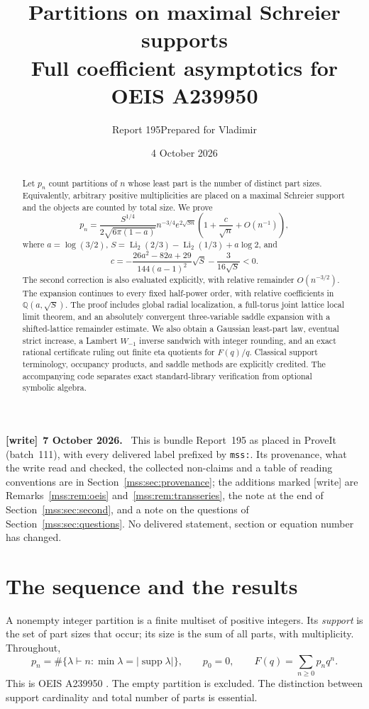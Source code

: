 \documentclass[11pt,letterpaper]{article}
\title{\LARGE\bfseries Partitions on maximal Schreier supports\\[8pt]\large Full coefficient asymptotics for OEIS A239950}
\author{Report 195\quad Prepared for Vladimir}
\date{4 October 2026}
\numberwithin{equation}{section}
\theoremstyle{definition}\newtheorem{definition}[theorem]{Definition}
\theoremstyle{remark}\newtheorem{remark}[theorem]{Remark}
\DeclareMathOperator{\Li}{Li}
\newcommand{\file}[1]{\nolinkurl{#1}}
\newenvironment{writenote}[1][]{\par\smallskip\begingroup\small
 \noindent\textbf{[write]}\if\relax\detokenize{#1}\relax\else~\textbf{#1.}\fi\ }%
 {\par\endgroup\smallskip}
\begin{document}
\maketitle
\begin{abstract}
Let $p_n$ count partitions of $n$ whose least part is the number of distinct part sizes. Equivalently, arbitrary positive multiplicities are placed on a maximal Schreier support and the objects are counted by total size. We prove
\[
p_n=\frac{S^{1/4}}{2\sqrt{6\pi(1-a)}}n^{-3/4}e^{2\sqrt{Sn}}
\left(1+\frac{c}{\sqrt n}+O(n^{-1})\right),
\]
where $a=\log(3/2)$, $S=\Li_2(2/3)-\Li_2(1/3)+a\log2$, and
\[
c=-\frac{26a^2-82a+29}{144(a-1)^2}\sqrt S-\frac{3}{16\sqrt S}<0.
\]
The second correction is also evaluated explicitly, with relative remainder $O(n^{-3/2})$. The expansion continues to every fixed half-power order, with relative coefficients in $\mathbb Q(a,\sqrt S)$. The proof includes global radial localization, a full-torus joint lattice local limit theorem, and an absolutely convergent three-variable saddle expansion with a shifted-lattice remainder estimate. We also obtain a Gaussian least-part law, eventual strict increase, a Lambert $W_{-1}$ inverse sandwich with integer rounding, and an exact rational certificate ruling out finite eta quotients for $F(q)/q$. Classical support terminology, occupancy products, and saddle methods are explicitly credited. The accompanying code separates exact standard-library verification from optional symbolic algebra.
\end{abstract}
\begin{writenote}[7 October 2026]
This is bundle Report~195 as placed in ProveIt (batch~111), with every
delivered label prefixed by \file{mss:}. Its provenance, what the write read
and checked, the collected non-claims and a table of reading conventions are
in Section~\ref{mss:sec:provenance}; the additions marked [write] are
Remarks~\ref{mss:rem:oeis} and~\ref{mss:rem:transseries}, the note at the
end of Section~\ref{mss:sec:second}, and a note on the questions of Section~\ref{mss:sec:questions}. No delivered statement,
section or equation number has changed.
\end{writenote}
\clearpage
{\setcounter{tocdepth}{1}\small\tableofcontents}
\newpage

\section{The sequence and the results}\label{mss:sec:results}
A nonempty integer partition is a finite multiset of positive integers. Its \emph{support} is the set of part sizes that occur; its size is the sum of all parts, with multiplicity. Throughout,
\begin{equation}\label{mss:eq:def}
p_n=\#\{\lambda\vdash n:\min\lambda=|\operatorname{supp}\lambda|\},
\qquad p_0=0,
\qquad F(q)=\sum_{n\ge0}p_nq^n.
\end{equation}
This is OEIS A239950 \cite{oeis}. The empty partition is excluded. The distinction between support cardinality and total number of parts is essential.
\end{document}

